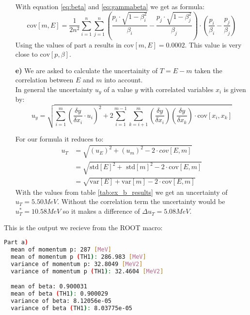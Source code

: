 \documentclass[10pt]{article}
\newenvironment{myfont}{\fontfamily{put}\selectfont}{\par}
\begin{document}
\begin{myfont}
\begin{itemize}
   With equation \ref{eq:beta} and \ref{eq:gammabeta} we get as formula:
   \begin{equation}
   \textrm{cov}[m, E] = \frac{1}{2n^2} \sum_{i=1}^n \sum_{j=1}^n \left(\frac{p_i \cdot \sqrt{1- \beta_i^2}}{\beta_i} -  \frac{p_j \cdot \sqrt{1- \beta_j^2}}{\beta_j}\right) \cdot \left(\frac{p_i}{\beta_i} - \frac{p_j}{\beta_j} \right)
   \end{equation}
   Using the values of part a results in $\textrm{cov}[m, E] = 0.0002 $. This value is very close to $\textrm{cov}[p, \beta]$.


  \item[\textbf{e)}] \label{part_e}
    We are asked to calculate the uncertainity of $T = E - m$ taken the correlation between $E$ and $m$ into account. \\
    In general the uncertainty $u_y$ of a value $y$ with correlated variables $x_i$ is given by:
   \begin{equation}
    u_y = \sqrt{\sum_{i=1}^m  \left(\frac{\delta y}{\delta x_i} \cdot u_i\right)^2 + 2 \sum_{i=1}^{m-1} \sum_{k=i+1}^{m}  \left(\frac{\delta y}{\delta x_i}\right)  \left(\frac{\delta y}{\delta x_k}\right) \cdot \textrm{cov}[x_i, x_k]}
   \end{equation}

   For our formula it reduces to:
  \begin{align}
    u_T &= \sqrt{ (u_E)^2 + (u_m)^2 - 2 \cdot cov[E, m]} \\
           &= \sqrt{ \textrm{std}[E]^2 +\textrm{ std}[m]^2 - 2 \cdot \textrm{cov}[E, m]} \\
           &= \sqrt{\textrm{var}[E] + \textrm{var}[m] - 2 \cdot \textrm{cov}[E, m]}
   \end{align}
  With the values from table \ref{tab:ex_b_results} we get an uncertainty of $u_T = 5.50 MeV$. Without the correlation term the uncertainty would be $u_T^* = 10.58 MeV$ so it makes a difference of $\Delta u_T = 5.08 MeV$.

\end{itemize}

\noindent This is the output we recieve from the ROOT macro:

{
\begin{lstlisting}[language=bash,caption={Output of ROOT macro into terminal}]
Part a)
  mean of momentum p: 287 [MeV]
  mean of momentum p (TH1): 286.983 [MeV]
  variance of momentum p: 32.8049 [MeV2]
  variance of momentum p (TH1): 32.4604 [MeV2]

  mean of beta: 0.900031
  mean of beta (TH1): 0.900029
  variance of beta: 8.12056e-05
  variance of beta (TH1): 8.03775e-05


\end{lstlisting}}
\end{myfont}
\end{document}
